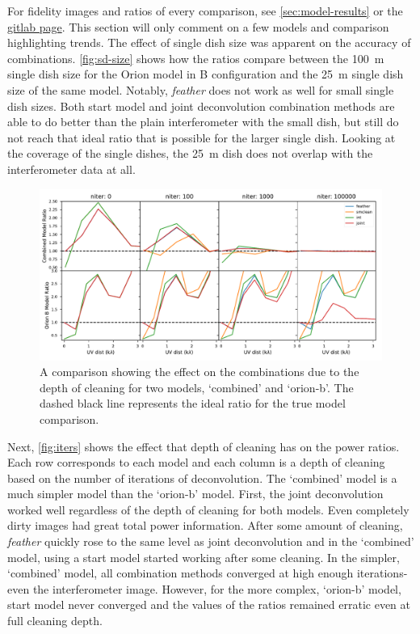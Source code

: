 \documentclass[preprint]{aastex63}
\begin{document}
For fidelity images and ratios of every comparison, see \autoref{sec:model-results} or the \href{https://mileslucas.gitlab.io/rica/index.html}{gitlab page}. This section will only comment on a few models and comparison highlighting trends. The effect of single dish size was apparent on the accuracy of combinations. \autoref{fig:sd-size} shows how the ratios compare between the \SI{100}{\meter} single dish size for the Orion model in B configuration and the \SI{25}{\meter} single dish size of the same model. Notably, \textit{feather} does not work as well for small single dish sizes. Both start model and joint deconvolution combination methods are able to do better than the plain interferometer with the small dish, but still do not reach that ideal ratio that is possible for the larger single dish. Looking at the coverage of the single dishes, the \SI{25}{\meter} dish does not overlap with the interferometer data at all.

\begin{figure}[ht]
    \includegraphics[width=\textwidth]{figures/iter-plot}
    \caption{A comparison showing the effect on the combinations due to the depth of cleaning for two models, `combined' and `orion-b'. The dashed black line represents the ideal ratio for the true model comparison. }
    \label{fig:iters}
\end{figure}

Next, \autoref{fig:iters} shows the effect that depth of cleaning has on the power ratios. Each row corresponds to each model and each column is a depth of cleaning based on the number of iterations of deconvolution. The `combined' model is a much simpler model than the `orion-b' model. First, the joint deconvolution worked well regardless of the depth of cleaning for both models. Even completely dirty images had great total power information. After some amount of cleaning, \textit{feather} quickly rose to the same level as joint deconvolution and in the `combined' model, using a start model started working after some cleaning. In the simpler, `combined' model, all combination methods converged at high enough iterations- even the interferometer image. However, for the more complex, `orion-b' model, start model never converged and the values of the ratios remained erratic even at full cleaning depth.
\end{document}
